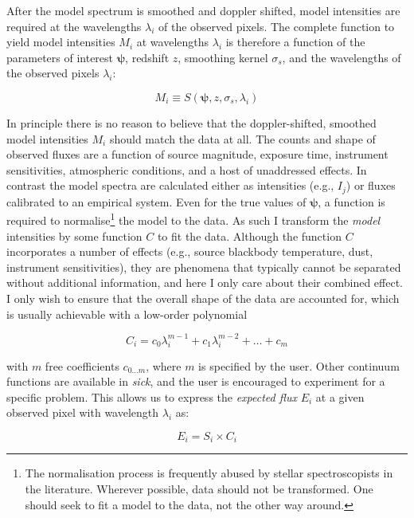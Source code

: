 \documentclass{aastex}
\newcommand{\sick}{\textit{sick}}
\begin{document}
After the model spectrum is smoothed and doppler shifted, model intensities are required at the wavelengths $\lambda_i$ of the observed pixels. The complete function to yield model intensities $M_i$ at wavelengths $\lambda_i$ is therefore a function of the parameters of interest $\bm{\psi}$, redshift $z$, smoothing kernel $\sigma_{s}$, and the wavelengths of the observed pixels $\lambda_i$:

\begin{equation}
 M_{i} \equiv S\left(\bm{\psi},z,\sigma_{s},\lambda_i\right)
\end{equation}

In principle there is no reason to believe that the doppler-shifted, smoothed model intensities $M_i$ should match the data at all. The counts and shape of observed fluxes are a function of source magnitude, exposure time, instrument sensitivities, atmospheric conditions, and a host of unaddressed effects. In contrast the model spectra are calculated either as intensities (e.g., $I_j$) or fluxes calibrated to an empirical system. Even for the true values of $\bm{\psi}$, a function is required to normalise\footnote{The normalisation process is frequently abused by stellar spectroscopists in the literature. Wherever possible, data should not be transformed. One should seek to fit a model to the data, not the other way around.} the model to the data. As such I transform the \textit{model} intensities by some function $C$ to fit the data. Although the function $C$ incorporates a number of effects (e.g., source blackbody temperature, dust, instrument sensitivities), they are phenomena that typically cannot be separated without additional information, and here I only care about their combined effect. I only wish to ensure that the overall shape of the data are accounted for, which is usually achievable with a low-order polynomial

\begin{equation}
C_i = c_{0}\lambda_{i}^{m-1} + c_{1}\lambda_{i}^{m-2} + \dots + c_{m}
\end{equation}

\noindent{}with $m$ free coefficients $c_{0\dots{}m}$, where $m$ is specified by the user. Other continuum functions are available in \sick{}, and the user is encouraged to experiment for a specific problem. This allows us to express the \textit{expected flux} $E_i$ at a given observed pixel with wavelength $\lambda_i$ as:

\begin{equation}
E_i = S_{i}\times{}C_i
\end{equation}
\end{document}
